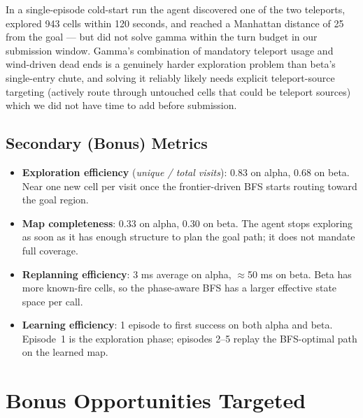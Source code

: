 \documentclass[11pt]{article}
\begin{document}
In a single-episode cold-start run the agent discovered one of the
two teleports, explored 943 cells within 120 seconds, and reached a
Manhattan distance of 25 from the goal --- but did not solve gamma
within the turn budget in our submission window.  Gamma's combination
of mandatory teleport usage and wind-driven dead ends is a genuinely
harder exploration problem than beta's single-entry chute, and
solving it reliably likely needs explicit teleport-source targeting
(actively route through untouched cells that could be teleport
sources) which we did not have time to add before submission.

\subsection{Secondary (Bonus) Metrics}

\begin{itemize}[itemsep=0.2em]
  \item \textbf{Exploration efficiency} (\emph{unique / total visits}):
    0.83 on alpha, 0.68 on beta.  Near one new cell per visit once the
    frontier-driven BFS starts routing toward the goal region.
  \item \textbf{Map completeness}: 0.33 on alpha, 0.30 on beta.  The
    agent stops exploring as soon as it has enough structure to plan
    the goal path; it does not mandate full coverage.
  \item \textbf{Replanning efficiency}: 3 ms average on alpha, $\approx$50 ms
    on beta.  Beta has more known-fire cells, so the phase-aware BFS
    has a larger effective state space per call.
  \item \textbf{Learning efficiency}: 1 episode to first success on
    both alpha and beta.  Episode~1 is the exploration phase;
    episodes 2--5 replay the BFS-optimal path on the learned map.
\end{itemize}

\section{Bonus Opportunities Targeted}
\end{document}
